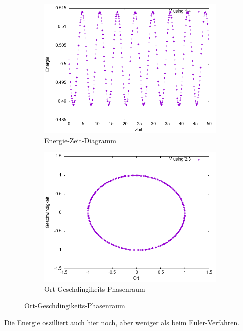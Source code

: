 \documentclass[
    oneside,
    ngerman,
    footinclude=false,
    captions=tableheading,
    DIV=12
]{scrartcl}
\begin{document}
            \begin{figure}[H]
            \centering
            \begin{subfigure}[b]{0.45\textwidth}
                \centering
                \includegraphics[width=\textwidth]{Bilddateien/RK2A1(a)-01-E.png}
                \caption{Energie-Zeit-Diagramm}
                \label{fig:RK2A1(a)-01-0-E}
            \end{subfigure}
            \hfill
            \begin{subfigure}[b]{0.45\textwidth}
                \centering
                \includegraphics[width=\textwidth]{Bilddateien/RK2A1(a)-01-0-xv.png}
                \caption{Ort-Geschdingikeits-Phasenraum}
                \label{fig:RK2A1(a)-01-0-xv}
            \end{subfigure}
            \end{figure}
            Die Energie oszilliert auch hier noch, aber weniger als beim Euler-Verfahren.
\end{document}
